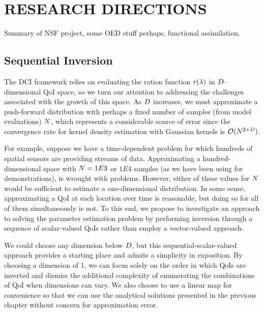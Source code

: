 \chapter{\uppercase{Research Directions} \label{chapter:05}}

Summary of NSF project, some OED stuff perhaps, functional assimilation.

\section{Sequential Inversion}\label{sec:ch05-sequential}

The DCI framework relies on evaluating the ration function $r(\lambda)$ in $D$--dimensional QoI space, so we turn our attention to addressing the challenges associated with the growth of this space.
As $D$ increases, we must approximate a push-forward distribution with perhaps a fixed number of samples (from model evaluations) $N$, which represents a considerable source of error since the convergence rate for kernel density estimation with Gaussian kernels is $\mathcal{O} (N^{2+D})$.

For example, suppose we have a time-dependent problem for which hundreds of spatial sensors are providing streams of data.
Approximating a hundred-dimensional space with $N = 1E3$ or $1E4$ samples (as we have been using for demonstrations), is wrought with problems.
However, either of these values for $N$ would be sufficient to estimate a one-dimensional distribution.
In some sense, approximating a QoI at each location over time is reasonable, but doing so for all of them simultaneously is not.
To this end, we propose to investigate an approach to solving the parameter estimation problem by performing inversion through a sequence of scalar-valued QoIs rather than employ a vector-valued approach.

We could choose any dimension below $D$, but this sequential-scalar-valued approach provides a starting place and admits a simplicity in exposition.
By choosing a dimension of 1, we can focus solely on the order in which QoIs are inverted and dismiss the additional complexity of enumerating the combinations of QoI when dimensions can vary.
We also choose to use a linear map for convenience so that we can use the analytical solutions presented in the previous chapter without concern for approximation error.

